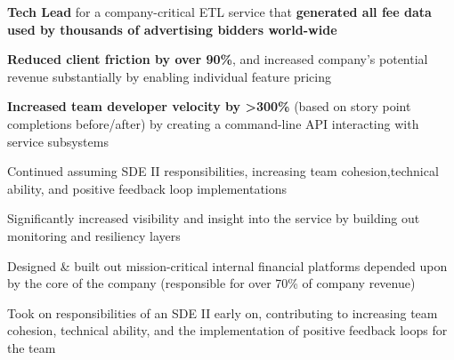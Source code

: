 \documentclass[]{two-column-resume}
\begin{document}
\begin{minipage}[t]{0.65\textwidth}

 \vspace{\topsep} %

\begin{tightemize}
\item \textbf{Tech Lead} for a company-critical ETL service that \textbf{generated all fee data used by thousands of advertising bidders world-wide}
\item \textbf{Reduced client friction by over 90\%}, and increased
company's potential revenue substantially by enabling individual feature pricing
\item {\bf Increased team developer velocity by >300\%} (based on story point
completions before/after) by creating a command-line API interacting
with service subsystems
\item Continued assuming SDE II responsibilities, increasing team cohesion,technical ability, and positive feedback loop implementations
\item Significantly increased visibility and insight into the service by building out monitoring and resiliency layers
\end{tightemize}
\sectionsep


\vspace{\topsep} %

\begin{tightemize}
\item Designed \& built out mission-critical internal financial platforms depended upon by the core of the company (responsible for over 70\% of company revenue)
\item Took on responsibilities of an SDE II early on, contributing to increasing team cohesion, technical ability, and the implementation of positive feedback loops for the team
\end{tightemize}
\sectionsep





\end{minipage}
\end{document}
